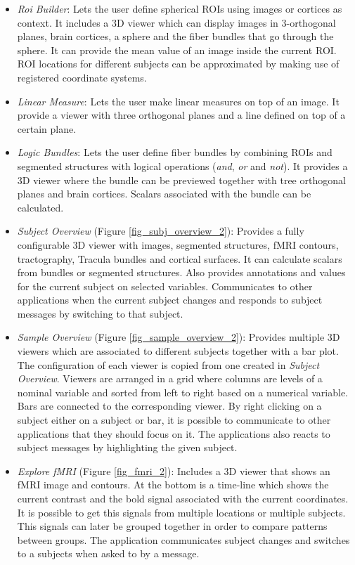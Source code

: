 \begin{itemize}

\item \emph{Roi Builder}: Lets the user define spherical ROIs using images or cortices as context. It includes a 3D viewer which can display images in 3-orthogonal planes, brain cortices, a sphere and the fiber bundles that go through the sphere. It can provide the mean value of an image inside the current ROI. ROI locations for different subjects can be approximated by making use of registered coordinate systems.

\item \emph{Linear Measure}: Lets the user make linear measures on top of an image. It provide a viewer with three orthogonal planes and a line defined on top of a certain plane.

\item \emph{Logic Bundles}: Lets the user define fiber bundles by combining ROIs and segmented structures with logical operations (\emph{and}, \emph{or} and \emph{not}). It provides a 3D viewer where the bundle can be previewed together with tree orthogonal planes and brain cortices. Scalars associated with the bundle can be calculated.

\item \emph{Subject Overview} (Figure \ref{fig_subj_overview_2}): Provides a fully configurable 3D viewer with images, segmented structures, fMRI contours, tractography, Tracula bundles and cortical surfaces. It can calculate scalars from bundles or segmented structures. Also provides annotations and values for the current subject on selected variables. Communicates to other applications when the current subject changes and responds to subject messages by switching to that subject.

\item \emph{Sample Overview} (Figure \ref{fig_sample_overview_2}): Provides multiple 3D viewers which are associated to different subjects together with a bar plot. The configuration of each viewer is copied from one created in \emph{Subject Overview}. Viewers are arranged in a grid where columns are levels of a nominal variable and sorted from left to right based on a numerical variable. Bars are connected to the corresponding viewer. By right clicking on a subject either on a subject or bar, it is possible to communicate to other applications that they should focus on it. The applications also reacts to subject messages by highlighting the given subject.

\item \emph{Explore fMRI} (Figure \ref{fig_fmri_2}): Includes a 3D viewer that shows an fMRI image and contours. At the bottom is a time-line which shows the current contrast and the bold signal associated with the current coordinates. It is possible to get this signals from multiple locations or multiple subjects. This signals can later be grouped together in order to compare patterns between groups. The application communicates subject changes and switches to a subjects when asked to by a message.


\end{itemize}
